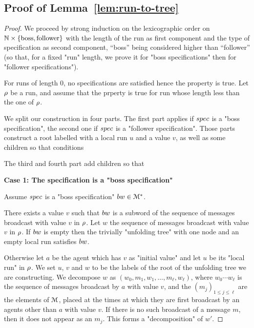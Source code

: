 \subsection{Proof of Lemma~\ref{lem:run-to-tree}}

\LemRunToTree*

\begin{proof}
	
	We proceed by strong induction on the lexicographic order on $\mathbb{N} \times \{\text{boss}, \text{follower}\}$ with the length of the run as first component and the type of specification as second component, ``boss'' being considered higher than ``follower'' (so that, for a fixed "run" length, we prove it for "boss specifications" then for "follower specifications"). 
	
	For runs of length $0$, no specifications are satisfied hence the property is true.
	Let $\rho$ be a run, and assume that the prperty is true for run whose length less than the one of $\rho$. 
	
	We split our construction in four parts. The first part applies if $\spec$ is a "boss specification", the second one if $\spec$ is a "follower specification". 
	Those parts construct a root labelled with a local run $u$ and a value $v$, as well as some children so that conditions 
	
	The third and fourth part add children so that 
	
	\textbf{Case 1: The specification is a "boss specification"}
	
	Assume $\spec$ is a "boss specification" $\bossspec \in \messages^*$.
	
	There exists a value $v$ such that $\bossspec$ is a subword of the sequence of messages broadcast with value $v$ in $\rho$. Let $w$ the sequence of messages broadcast with value $v$ in $\rho$.
	If $\bossspec$ is empty then the trivially "unfolding tree" with one node and an empty local run satisfies $\bossspec$.	
	
	Otherwise let $a$ be the agent which has $v$ as "initial value" and let $u$ be its "local run" in $\rho$. We set $u$, $v$ and $w$ to be the labels of the root of the unfolding tree we are constructing.
	We decompose $w$ as $(w_0, m_1, w_1, \ldots, m_\ell, w_\ell)$, where $w_0\cdots w_\ell$ is the sequence of messages broadcast by $a$ with value $v$, and the $(m_j)_{1\leq j\leq \ell}$ are the elements of $\mathcal{M}$, placed at the times at which they are first broadcast by an agents other than $a$ with value $v$. If there is no such broadcast of a message $m$, then it does not appear as an $m_j$. This forms a "decomposition" of $w'$.
	

\end{proof}
